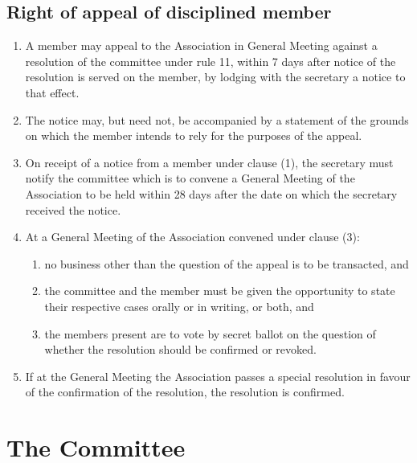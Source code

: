 \documentclass{article}
\begin{document}
\subsection{Right of appeal of disciplined member}
\begin{enumerate}
  \item A member may appeal to the Association in General Meeting against a resolution of the committee under rule 11, within 7 days after notice of the resolution is served on the member, by lodging with the secretary a notice to that effect.
  \item The notice may, but need not, be accompanied by a statement of the grounds on which the member intends to rely for the purposes of the appeal.
  \item On receipt of a notice from a member under clause (1), the secretary must notify the committee which is to convene a General Meeting of the Association to be held within 28 days after the date on which the secretary received the notice.
  \item At a General Meeting of the Association convened under clause (3):
    \begin{enumerate}
      \item no business other than the question of the appeal is to be transacted, and
      \item the committee and the member must be given the opportunity to state their respective cases orally or in writing, or both, and
      \item the members present are to vote by secret ballot on the question of whether the resolution should be confirmed or revoked.
    \end{enumerate}
  \item If at the General Meeting the Association passes a special resolution in favour of the confirmation of the resolution, the resolution is confirmed.
\end{enumerate}
\section{The Committee}
\end{document}
